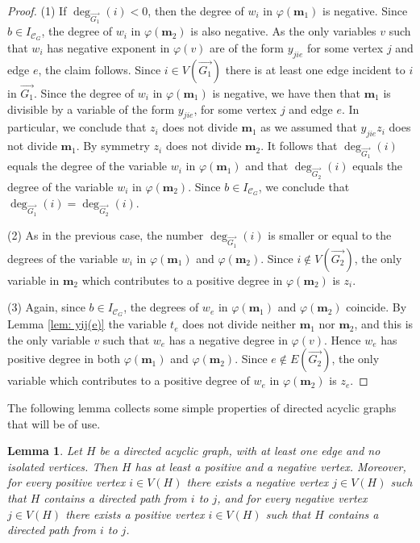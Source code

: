 \documentclass[11pt]{article}
\newtheorem{lemm}[theo]{Lemma}
\theoremstyle{definition}
\numberwithin{equation}{section}
\begin{document}
\begin{proof}
     (1) If $\deg_{\overrightarrow{G_1}}(i)<0$, then the degree of $w_i$ in $\varphi(\mathbf{m}_1)$ is negative. Since $b\in I_{\mathcal{C}_G}$, the degree of $w_i$ in $\varphi(\mathbf{m}_2)$ is also negative. As the only variables $v$ such that $w_i$ has negative exponent in $\varphi(v)$ are of the form $y_{jie}$ for some vertex $j$ and edge $e$, the claim follows. Since $i\in V(\overrightarrow{G_1})$ there is at least one edge incident to $i$ in $\overrightarrow{G_1}$. Since the degree of $w_i$ in $\varphi(\mathbf{m}_1)$ is negative, we have then that $\mathbf{m}_1$ is divisible by a variable of the form $y_{jie}$, for some vertex $j$ and edge $e$. In particular, we conclude that $z_i$ does not divide $\mathbf{m}_1$ as we assumed that $y_{jie}z_i$ does not divide $\mathbf{m}_1$. By symmetry $z_i$ does not divide $\mathbf{m}_2$. It follows that $\deg_{\overrightarrow{G_1}}(i)$ equals the degree of the variable $w_i$ in $\varphi(\mathbf{m}_1)$ and that $\deg_{\overrightarrow{G_2}}(i)$ equals the degree of the variable $w_i$ in $\varphi(\mathbf{m}_2)$. Since $b\in I_{\mathcal{C}_G}$, we conclude that $\deg_{\overrightarrow{G_1}}(i)=\deg_{\overrightarrow{G_2}}(i)$. 
          
     (2) As in the previous case, the number $\deg_{\overrightarrow{G_1}}(i)$ is smaller or equal to the degrees of the variable $w_i$ in $\varphi(\mathbf{m}_1)$ and $\varphi(\mathbf{m}_2)$. Since $i\notin V(\overrightarrow{G_2})$, the only variable in $\mathbf{m}_2$ which contributes to a positive degree in $\varphi(\mathbf{m}_2)$ is $z_i$. 
     
     (3) Again, since $b\in I_{\mathcal{C}_G}$, the degrees of $w_e$ in $\varphi(\mathbf{m}_1)$ and $\varphi(\mathbf{m}_2)$ coincide. By Lemma \ref{lem: yij(e)} the variable $t_e$ does not divide neither $\mathbf{m}_1$ nor $\mathbf{m}_2$, and this is the only variable $v$ such that $w_e$ has a negative degree in $\varphi(v)$. Hence $w_e$ has positive degree in both $\varphi(\mathbf{m}_1)$ and $\varphi(\mathbf{m}_2)$. Since $e\notin E(\overrightarrow{G_2})$, the only variable which contributes to a positive degree of $w_e$ in $\varphi(\mathbf{m}_2)$ is $z_e$.
\end{proof}

The following lemma collects some simple properties of directed acyclic graphs that will be of use.

\begin{lemm}\label{lem: directed acyclic properties}
    Let $H$ be a directed acyclic graph, with at least one edge and no isolated vertices. Then $H$ has at least a positive and a negative vertex. Moreover, for every positive vertex $i\in V(H)$ there exists a negative vertex $j\in V(H)$ such that $H$ contains a directed path from $i$ to $j$, and for every negative vertex $j\in V(H)$ there exists a positive vertex $i\in V(H)$ such that $H$ contains a directed path from $i$ to $j$.
\end{lemm}
\end{document}

